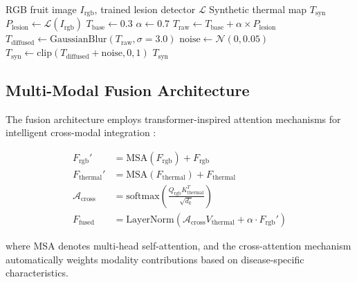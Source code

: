\documentclass[conference]{IEEEtran}
\begin{document}
\begin{algorithm}[!t]
    \caption{Thermal Synthesis Pipeline}
    \label{alg:thermal}
    \begin{algorithmic}[1]
        \REQUIRE RGB fruit image $I_{\text{rgb}}$, trained lesion detector $\mathcal{L}$
        \ENSURE Synthetic thermal map $T_{\text{syn}}$
        \STATE $P_{\text{lesion}} \leftarrow \mathcal{L}(I_{\text{rgb}})$
        \STATE $T_{\text{base}} \leftarrow 0.3$
        \STATE $\alpha \leftarrow 0.7$
        \STATE $T_{\text{raw}} \leftarrow T_{\text{base}} + \alpha \times P_{\text{lesion}}$
        \STATE $T_{\text{diffused}} \leftarrow \text{GaussianBlur}(T_{\text{raw}}, \sigma=3.0)$
        \STATE $\text{noise} \leftarrow \mathcal{N}(0, 0.05)$
        \STATE $T_{\text{syn}} \leftarrow \text{clip}(T_{\text{diffused}} + \text{noise}, 0, 1)$
        \RETURN $T_{\text{syn}}$
    \end{algorithmic}
\end{algorithm}

\subsection{Multi-Modal Fusion Architecture}
The fusion architecture employs transformer-inspired attention mechanisms for intelligent cross-modal integration \cite{vaswani2017,devlin2019}:

\begin{align}
    F_{\text{rgb}}' &= \text{MSA}(F_{\text{rgb}}) + F_{\text{rgb}} \\
    F_{\text{thermal}}' &= \text{MSA}(F_{\text{thermal}}) + F_{\text{thermal}} \\
    \mathcal{A}_{\text{cross}} &= \text{softmax}\left(\frac{Q_{\text{rgb}} K_{\text{thermal}}^T}{\sqrt{d_k}}\right) \\
    F_{\text{fused}} &= \text{LayerNorm}(\mathcal{A}_{\text{cross}} V_{\text{thermal}} + \alpha \cdot F_{\text{rgb}}')
\end{align}

where MSA denotes multi-head self-attention, and the cross-attention mechanism automatically weights modality contributions based on disease-specific characteristics.
\end{document}
